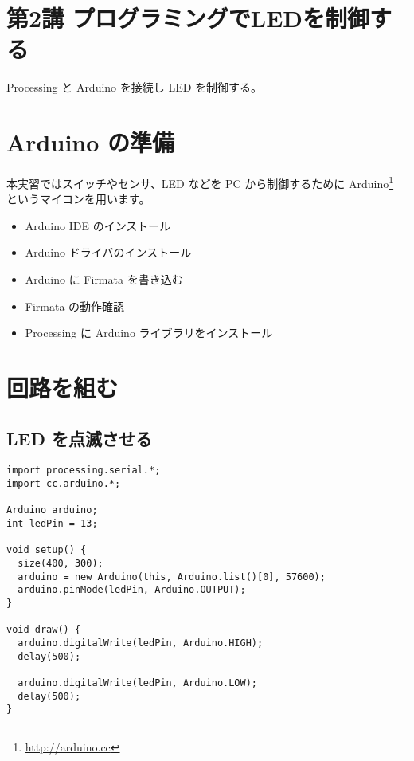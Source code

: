 \documentclass[11pt,a4paper]{jarticle}
\begin{document}
\section*{\LARGE{第2講 プログラミングでLEDを制御する}}
Processing と Arduino を接続し LED を制御する。



\section{Arduino の準備}
本実習ではスイッチやセンサ、LED などを PC から制御するために Arduino\footnote{\url{http://arduino.cc}} というマイコンを用います。

\begin{itemize}
 \item Arduino IDE のインストール
 \item Arduino ドライバのインストール
 \item Arduino に Firmata を書き込む
 \item Firmata の動作確認
 \item Processing に Arduino ライブラリをインストール       
\end{itemize}


\section{回路を組む}

\subsection*{LED を点滅させる}
\begin{lstlisting}
import processing.serial.*;
import cc.arduino.*;
 
Arduino arduino;
int ledPin = 13;
 
void setup() {
  size(400, 300);
  arduino = new Arduino(this, Arduino.list()[0], 57600);
  arduino.pinMode(ledPin, Arduino.OUTPUT);
}
 
void draw() {
  arduino.digitalWrite(ledPin, Arduino.HIGH);
  delay(500);
  
  arduino.digitalWrite(ledPin, Arduino.LOW);
  delay(500);  
}
\end{lstlisting}
\end{document}
